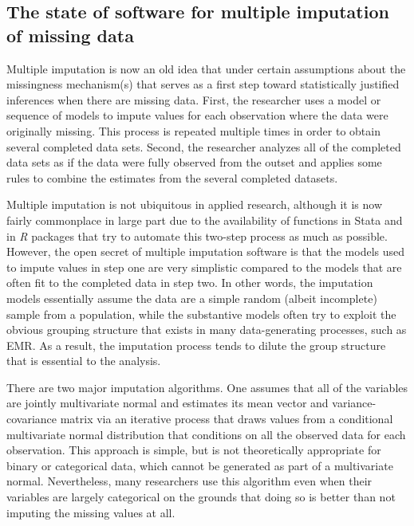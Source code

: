 \documentclass[11pt,notitlepage]{article}
\begin{document}
\subsection*{The state of software for multiple imputation of missing data}

Multiple imputation is now an old idea that under certain assumptions about the missingness 
mechanism(s) that serves as a first step toward statistically justified inferences when there
are missing data. First, the researcher uses a model or sequence of models to impute values for 
each observation where the data were originally missing. This process is repeated multiple times
in order to obtain several completed data sets. Second, the researcher analyzes all of the 
completed data sets as if the data were fully observed from the outset and applies some rules to
combine the estimates from the several completed datasets.

Multiple imputation is not ubiquitous in applied research, although it is now fairly commonplace
in large part due to the availability of functions in Stata and in \textit{R} packages that try
to automate this two-step process as much as possible. However, the open secret of multiple
imputation software is that the models used to impute values in step one are very simplistic
compared to the models that are often fit to the completed data in step two. In other words,
the imputation models essentially assume the data are a simple random (albeit incomplete)
sample from a population, while the substantive models often try to exploit the obvious
grouping structure that exists in many data-generating processes, such as EMR. As a result,
the imputation process tends to dilute the group structure that is essential to the analysis.

There are two major imputation algorithms. One assumes that all of the variables are jointly
multivariate normal and estimates its mean vector and variance-covariance matrix via an
iterative process that draws values from a conditional multivariate normal distribution that
conditions on all the observed data for each observation. This approach is simple, but is 
not theoretically appropriate for binary or categorical data, which cannot be generated as
part of a multivariate normal. Nevertheless, many researchers use this algorithm even when
their variables are largely categorical on the grounds that doing so is better than not
imputing the missing values at all.
\end{document}
